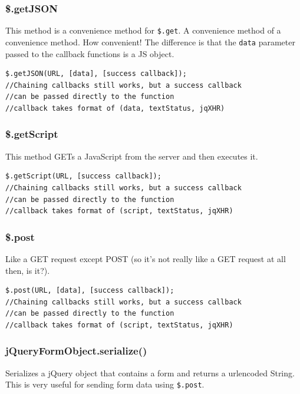 \documentclass[12pt]{article}
\begin{document}
\subsubsection*{\$.getJSON}
This method is a convenience method for \texttt{\$.get}. A convenience method of a convenience method. How convenient! The difference is that the \texttt{data} parameter passed to the callback functions is a JS object.
\begin{Verbatim}[frame=single]
$.getJSON(URL, [data], [success callback]);
//Chaining callbacks still works, but a success callback
//can be passed directly to the function
//callback takes format of (data, textStatus, jqXHR)
\end{Verbatim}

\subsubsection*{\$.getScript}
This method GETs a JavaScript from the server and then executes it.
\begin{Verbatim}[frame=single]
$.getScript(URL, [success callback]);
//Chaining callbacks still works, but a success callback
//can be passed directly to the function
//callback takes format of (script, textStatus, jqXHR)
\end{Verbatim}

\subsubsection*{\$.post}
Like a GET request except POST (so it's not really like a GET request at all then, is it?).
\begin{Verbatim}[frame=single]
$.post(URL, [data], [success callback]);
//Chaining callbacks still works, but a success callback
//can be passed directly to the function
//callback takes format of (script, textStatus, jqXHR)
\end{Verbatim}

\subsubsection*{jQueryFormObject.serialize()}
Serializes a jQuery object that contains a form and returns a urlencoded String. This is very useful for sending form data using \texttt{\$.post}.
\end{document}
